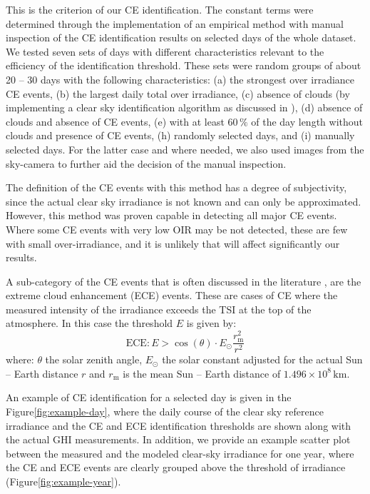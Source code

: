 \documentclass[preprint, 5p,
authoryear]{elsarticle} %
\begin{document}
This is the criterion of our CE identification. The constant terms were
determined through the implementation of an empirical method with manual
inspection of the CE identification results on selected days of the
whole dataset. We tested seven sets of days with different
characteristics relevant to the efficiency of the identification
threshold. These sets were random groups of about 20 -- 30 days with the
following characteristics: (a) the strongest over irradiance CE events,
(b) the largest daily total over irradiance, (c) absence of clouds (by
implementing a clear sky identification algorithm as discussed in
\citet{Natsis2023}), (d) absence of clouds and absence of CE events, (e)
with at least \(60\,\%\) of the day length without clouds and presence
of CE events, (h) randomly selected days, and (i) manually selected
days. For the latter case and where needed, we also used images from the
sky-camera to further aid the decision of the manual inspection.

The definition of the CE events with this method has a degree of
subjectivity, since the actual clear sky irradiance is not known and can
only be approximated. However, this method was proven capable in
detecting all major CE events. Where some CE events with very low OIR
may be not detected, these are few with small over-irradiance, and it is
unlikely that will affect significantly our results.

A sub-category of the CE events that is often discussed in the
literature \citep{Cordero2023, Martins2022, Yordanov2015}, are the
extreme cloud enhancement (ECE) events. These are cases of CE where the
measured intensity of the irradiance exceeds the TSI at the top of the
atmosphere. In this case the threshold \(E\) is given by:
\begin{equation}
\text{ECE}: E > \cos(\theta) \cdot E_{\odot} \frac{r^2_\text{m}} {r^2}
\label{eq:ECE}
\end{equation} where: \(\theta\) the solar zenith angle, \(E_{\odot}\)
the solar constant adjusted for the actual Sun -- Earth distance \(r\)
and \(r_\text{m}\) is the mean Sun -- Earth distance of
\(1.496\times10^8\,\text{km}\).

An example of CE identification for a selected day is given in the
Figure\nobreakspace{}\ref{fig:example-day}, where the daily course of
the clear sky reference irradiance and the CE and ECE identification
thresholds are shown along with the actual GHI measurements. In
addition, we provide an example scatter plot between the measured and
the modeled clear-sky irradiance for one year, where the CE and ECE
events are clearly grouped above the threshold of irradiance
(Figure\nobreakspace{}\ref{fig:example-year}).
\end{document}
